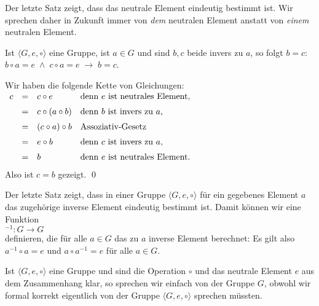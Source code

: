 \remark
Der letzte Satz zeigt, dass das neutrale Element eindeutig bestimmt ist.  Wir sprechen daher in Zukunft
immer von \emph{dem} neutralen Element anstatt von \emph{einem} neutralen Element.
\eox

\begin{Satz} \lb
  Ist $\langle G, e, \circ \rangle$ eine Gruppe, ist $a \in G$ und sind $b,c$ beide invers zu $a$, so folgt
  $b = c$:
  \\[0.2cm]
  \hspace*{1.3cm}
  $b \circ a = e \;\wedge\; c \circ a = e \;\rightarrow\; b = c$.
\end{Satz}

\proof
Wir haben die folgende Kette von Gleichungen:
\\[0.2cm]
\hspace*{1.3cm}
$
\begin{array}[t]{lcll}
  c & = & c \circ e & \mbox{denn $e$ ist neutrales Element,} \\[0.2cm]
    & = & c \circ (a \circ b) & \mbox{denn $b$ ist invers zu $a$,} \\[0.2cm]
    & = & (c \circ a) \circ b & \mbox{Assoziativ-Gesetz} \\[0.2cm]
    & = & e \circ b & \mbox{denn $c$ ist invers zu $a$,} \\[0.2cm]
    & = & b & \mbox{denn $e$ ist neutrales Element.} \\[0.2cm]
\end{array}
$
\\[0.2cm]
Also ist $c = b$ gezeigt. \qed


\remark Der letzte Satz zeigt, dass in einer Gruppe $\langle G, e, \circ \rangle$ für ein
gegebenes Element $a$ das zugehörige inverse Element eindeutig bestimmt ist.  Damit können
wir eine Funktion
\\[0.2cm]
\hspace*{1.3cm} $^{-1}: G \rightarrow G$
\\[0.2cm]
definieren, die für alle $a \in G$ das zu $a$ inverse Element berechnet: Es gilt also
\\[0.2cm]
\hspace*{1.3cm} $a^{-1} \circ a = e$ \quad und \quad $a \circ a^{-1} = e$ \quad für alle $a \in G$.
\eox

\remark
Ist $\langle G, e, \circ \rangle$ eine Gruppe und sind die Operation $\circ$ und das neutrale Element 
$e$ aus dem Zusammenhang klar, so sprechen wir einfach von der Gruppe $G$, obwohl wir formal korrekt
eigentlich von der Gruppe $\langle G, e, \circ \rangle$ sprechen müssten. 
\eox

